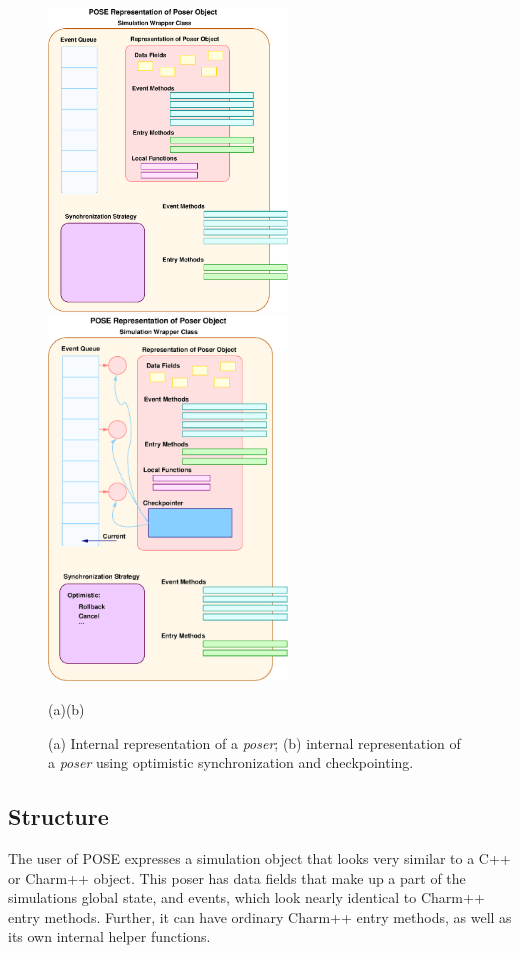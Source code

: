 \documentclass[10pt]{article}
\begin{document}
\begin{figure}[h]
\begin{center}
\includegraphics[width=2.5in]{pose_struct}
\hskip0.5in
\includegraphics[width=2.5in]{opt_struct}
\end{center}
\hskip1.7in(a)\hskip2.2in(b)\\
\caption{(a) Internal representation of a {\it poser}; (b) internal representation of a {\it poser} using optimistic
synchronization and checkpointing.}
\label{fig:pose_struct}
\end{figure}

\subsection{Structure}

The user of POSE expresses a simulation object that looks very similar
to a C++ or Charm++ object.  This poser has data fields that make up a
part of the simulations global state, and events, which look nearly
identical to Charm++ entry methods.  Further, it can have ordinary
Charm++ entry methods, as well as its own internal helper functions.  
\end{document}
